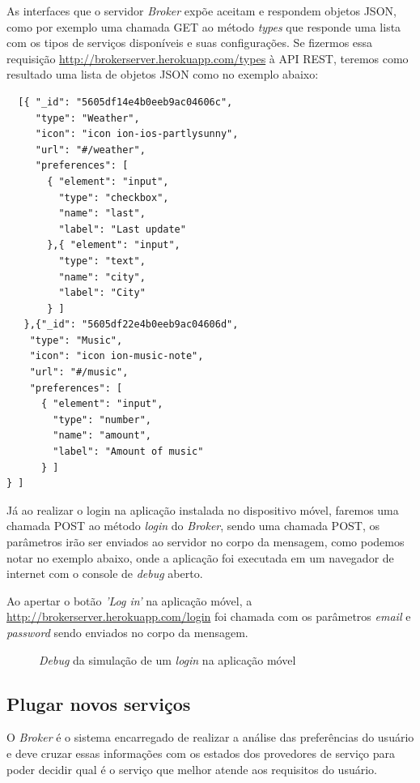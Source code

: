 As interfaces que o servidor \textit{Broker} expõe aceitam e respondem objetos JSON, como por exemplo uma chamada GET ao método \textit{types} que responde uma lista com os tipos de serviços disponíveis e suas configurações.
Se fizermos essa requisição \url{http://brokerserver.herokuapp.com/types} à API REST, teremos como resultado uma lista de objetos JSON como no exemplo abaixo:
\begin{verbatim}
  [{ "_id": "5605df14e4b0eeb9ac04606c",
     "type": "Weather",
     "icon": "icon ion-ios-partlysunny",
     "url": "#/weather",
     "preferences": [
       { "element": "input",
         "type": "checkbox",
         "name": "last",
         "label": "Last update"
       },{ "element": "input",
         "type": "text",
         "name": "city",
         "label": "City"
       } ]
   },{"_id": "5605df22e4b0eeb9ac04606d",
    "type": "Music",
    "icon": "icon ion-music-note",
    "url": "#/music",
    "preferences": [
      { "element": "input",
        "type": "number",
        "name": "amount",
        "label": "Amount of music"
      } ]
} ]
\end{verbatim}

Já ao realizar o login na aplicação instalada no dispositivo móvel, faremos uma chamada POST ao método \textit{login} do \textit{Broker}, sendo uma chamada POST, os parâmetros irão ser enviados ao servidor no corpo da mensagem, como podemos notar no exemplo abaixo, onde a aplicação foi executada em um navegador de internet com o console de \textit{debug} aberto.

Ao apertar o botão \textit{'Log in'} na aplicação móvel, a  \url{
http://brokerserver.herokuapp.com/login} foi chamada com os parâmetros \textit{email} e \textit{password} sendo enviados no corpo da mensagem.

\begin{figure}[h]
  \center
  \qquad
  \caption[\textit{Debug} da simulação de um \textit{login} na aplicação móvel]{\textit{Debug} da simulação de um \textit{login} na aplicação móvel}
\end{figure}

\subsection{Plugar novos serviços}
O \textit{Broker} é o sistema encarregado de realizar a análise das preferências do usuário e deve cruzar essas informações com os estados dos provedores de serviço para poder decidir qual é o serviço que melhor atende aos requisitos do usuário.

